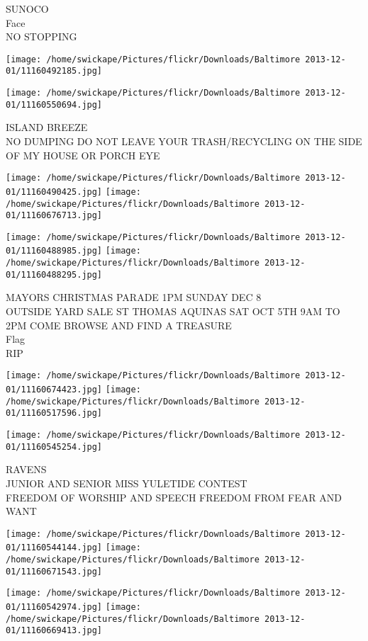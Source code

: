 \documentclass[10pt,letterpaper]{article}
\begin{document}
SUNOCO\\
Face\\
NO STOPPING
\pagebreak

\texttt{[image: /home/swickape/Pictures/flickr/Downloads/Baltimore 2013-12-01/11160492185.jpg]}

\vspace{0.25in}
\texttt{[image: /home/swickape/Pictures/flickr/Downloads/Baltimore 2013-12-01/11160550694.jpg]}

ISLAND BREEZE\\
NO DUMPING DO NOT LEAVE YOUR TRASH/RECYCLING ON THE SIDE OF MY HOUSE OR PORCH EYE
\pagebreak

\texttt{[image: /home/swickape/Pictures/flickr/Downloads/Baltimore 2013-12-01/11160490425.jpg]}
\texttt{[image: /home/swickape/Pictures/flickr/Downloads/Baltimore 2013-12-01/11160676713.jpg]}

\texttt{[image: /home/swickape/Pictures/flickr/Downloads/Baltimore 2013-12-01/11160488985.jpg]}
\texttt{[image: /home/swickape/Pictures/flickr/Downloads/Baltimore 2013-12-01/11160488295.jpg]}

MAYORS CHRISTMAS PARADE 1PM SUNDAY DEC 8\\
OUTSIDE YARD SALE ST THOMAS AQUINAS SAT OCT 5TH 9AM TO 2PM COME BROWSE AND FIND A TREASURE\\
Flag\\
RIP
\pagebreak

\texttt{[image: /home/swickape/Pictures/flickr/Downloads/Baltimore 2013-12-01/11160674423.jpg]}
\texttt{[image: /home/swickape/Pictures/flickr/Downloads/Baltimore 2013-12-01/11160517596.jpg]}

\vspace{0.25in}
\texttt{[image: /home/swickape/Pictures/flickr/Downloads/Baltimore 2013-12-01/11160545254.jpg]}

RAVENS\\
JUNIOR AND SENIOR MISS YULETIDE CONTEST\\
FREEDOM OF WORSHIP AND SPEECH FREEDOM FROM FEAR AND WANT
\pagebreak

\texttt{[image: /home/swickape/Pictures/flickr/Downloads/Baltimore 2013-12-01/11160544144.jpg]}
\texttt{[image: /home/swickape/Pictures/flickr/Downloads/Baltimore 2013-12-01/11160671543.jpg]}

\texttt{[image: /home/swickape/Pictures/flickr/Downloads/Baltimore 2013-12-01/11160542974.jpg]}
\texttt{[image: /home/swickape/Pictures/flickr/Downloads/Baltimore 2013-12-01/11160669413.jpg]}
\end{document}
